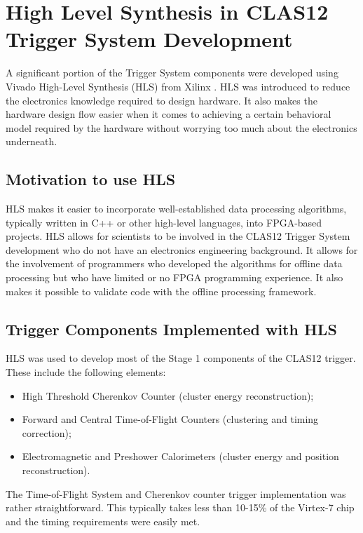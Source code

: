 \section{High Level Synthesis in CLAS12 Trigger System Development}
\label{sec:hls}

A significant portion of the Trigger System components were developed using Vivado High-Level Synthesis (HLS) from Xilinx \cite{hls-ref}. HLS was introduced to reduce the electronics knowledge required to design hardware. It also makes the hardware design flow easier when it comes to achieving a certain behavioral model required by the hardware without worrying too much about the electronics underneath.

\subsection{Motivation to use HLS}

HLS makes it easier to incorporate well-established data processing algorithms, typically written in C++ or other high-level languages, into FPGA-based projects. HLS allows for scientists to be involved in the CLAS12 Trigger System development who do not have an electronics engineering background. It allows for the involvement of programmers who developed the algorithms for offline data processing but who have limited or no FPGA programming experience. It also makes it possible to validate code with the offline processing framework.

\subsection{Trigger Components Implemented with HLS}

HLS was used to develop most of the Stage 1 components of the CLAS12 trigger. These include the following elements:

\begin{itemize}
	\item High Threshold Cherenkov Counter (cluster energy reconstruction);
	\item Forward and Central Time-of-Flight Counters (clustering and timing correction);
	\item Electromagnetic and Preshower Calorimeters (cluster energy and position reconstruction).
\end{itemize}

The Time-of-Flight System and Cherenkov counter trigger implementation was rather straightforward. This typically takes less than 10-15\% of the Virtex-7 chip and the timing requirements were easily met.

